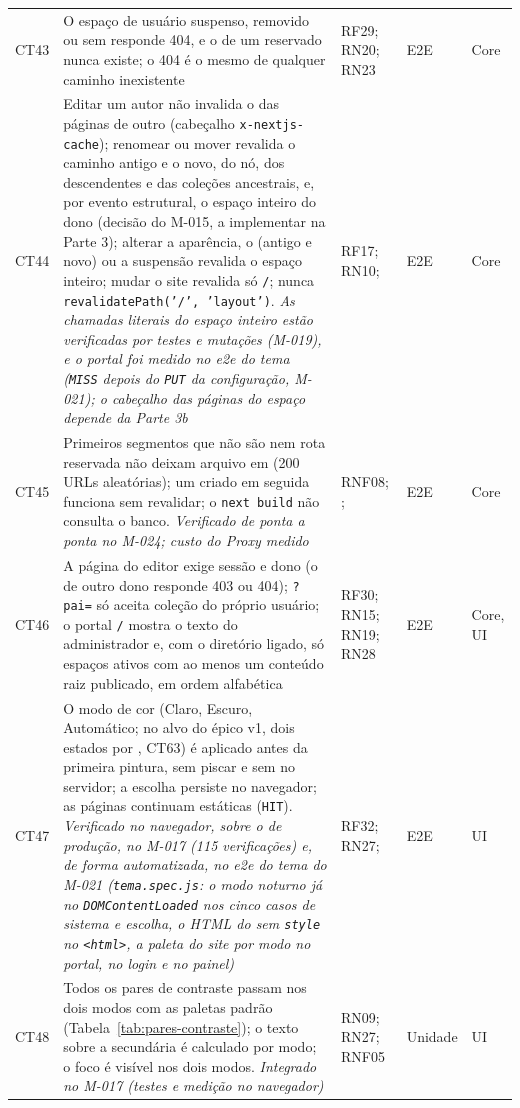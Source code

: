 \begin{longtable}{@{}L{1.1cm}L{7.0cm}L{2.2cm}L{1.6cm}L{1.6cm}@{}}
CT43 & O espaço de usuário suspenso, removido ou sem  responde 404, e o de um  reservado nunca existe; o 404 é o mesmo de qualquer caminho inexistente & RF29; RN20; RN23 & E2E & Core\\[2pt]
CT44 & Editar um autor não invalida o  das páginas de outro (cabeçalho \texttt{x-nextjs-cache}); renomear ou mover revalida o caminho antigo e o novo, do nó, dos descendentes e das coleções ancestrais, e, por evento estrutural, o espaço inteiro do dono (decisão do M-015, a implementar na Parte 3); alterar a aparência, o  (antigo e novo) ou a suspensão revalida o espaço inteiro; mudar o site revalida só \texttt{/}; nunca \texttt{revalidatePath('/', 'layout')}. \emph{As chamadas literais do espaço inteiro estão verificadas por testes e mutações (M-019), e o portal foi medido no e2e do tema (\texttt{MISS} depois do \texttt{PUT} da configuração, M-021); o cabeçalho das páginas do espaço depende da Parte 3b} & RF17; RN10;  & E2E & Core\\[2pt]
CT45 & Primeiros segmentos que não são  nem rota reservada não deixam arquivo em  (200 URLs aleatórias); um  criado em seguida funciona sem revalidar; o \texttt{next build} não consulta o banco. \emph{Verificado de ponta a ponta no M-024; custo do Proxy medido} & RNF08; ;  & E2E & Core\\[2pt]
CT46 & A página do editor exige sessão e dono (o de outro dono responde 403 ou 404); \texttt{?pai=} só aceita coleção do próprio usuário; o portal \texttt{/} mostra o texto do administrador e, com o diretório ligado, só espaços ativos com ao menos um conteúdo raiz publicado, em ordem alfabética & RF30; RN15; RN19; RN28 & E2E & Core, UI\\[2pt]
CT47 & O modo de cor (Claro, Escuro, Automático; no alvo do épico v1, dois estados por , CT63) é aplicado antes da primeira pintura, sem piscar e sem  no servidor; a escolha persiste no navegador; as páginas continuam estáticas (\texttt{HIT}). \emph{Verificado no navegador, sobre o  de produção, no M-017 (115 verificações) e, de forma automatizada, no e2e do tema do M-021 (\texttt{tema.spec.js}: o modo noturno já no \texttt{DOMContentLoaded} nos cinco casos de sistema e escolha, o HTML do  sem \texttt{style} no \texttt{<html>}, a paleta do site por modo no portal, no login e no painel)} & RF32; RN27;  & E2E & UI\\[2pt]
CT48 & Todos os pares de contraste passam nos dois modos com as paletas padrão (Tabela~\ref{tab:pares-contraste}); o texto sobre a secundária é calculado por modo; o foco é visível nos dois modos. \emph{Integrado no M-017 (testes e medição no navegador)} & RN09; RN27; RNF05 & Unidade & UI\\[2pt]

\end{longtable}

